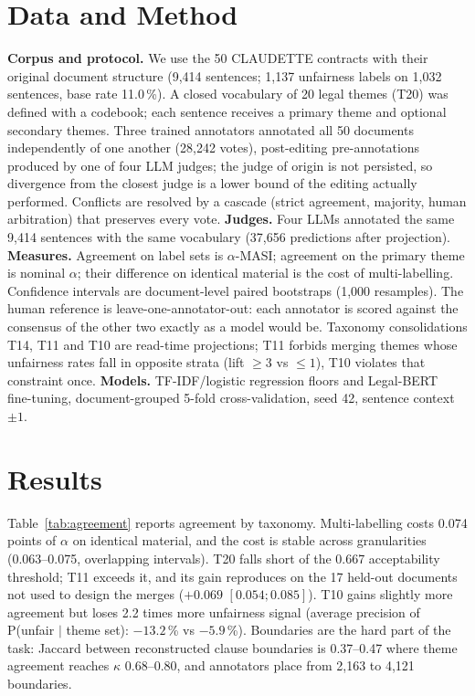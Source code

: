 \documentclass{IOS-Book-Article}
\newcommand{\corpus}{CLAUDETTE}
\begin{document}
\section{Data and Method}
\label{sec:method}
\textbf{Corpus and protocol.} We use the 50 \corpus{} contracts with their original document structure (9,414 sentences; 1,137 unfairness labels on 1,032 sentences, base rate 11.0\,\%). A closed vocabulary of 20 legal themes (T20) was defined with a codebook; each sentence receives a primary theme and optional secondary themes. Three trained annotators annotated all 50 documents independently of one another (28,242 votes), post-editing pre-annotations produced by one of four LLM judges; the judge of origin is not persisted, so divergence from the closest judge is a lower bound of the editing actually performed. Conflicts are resolved by a cascade (strict agreement, majority, human arbitration) that preserves every vote. \textbf{Judges.} Four LLMs annotated the same 9,414 sentences with the same vocabulary (37,656 predictions after projection). \textbf{Measures.} Agreement on label sets is $\alpha$-MASI; agreement on the primary theme is nominal $\alpha$; their difference on identical material is the cost of multi-labelling. Confidence intervals are document-level paired bootstraps (1,000 resamples). The human reference is leave-one-annotator-out: each annotator is scored against the consensus of the other two exactly as a model would be. Taxonomy consolidations T14, T11 and T10 are read-time projections; T11 forbids merging themes whose unfairness rates fall in opposite strata (lift $\ge 3$ vs $\le 1$), T10 violates that constraint once. \textbf{Models.} TF-IDF/logistic regression floors and Legal-BERT~\cite{chalkidis2020legalbert} fine-tuning, document-grouped 5-fold cross-validation, seed 42, sentence context $\pm1$.

\section{Results}
\label{sec:results}
Table~\ref{tab:agreement} reports agreement by taxonomy. Multi-labelling costs 0.074 points of $\alpha$ on identical material, and the cost is stable across granularities (0.063--0.075, overlapping intervals). T20 falls short of the 0.667 acceptability threshold; T11 exceeds it, and its gain reproduces on the 17 held-out documents not used to design the merges ($+0.069$ $[0.054; 0.085]$). T10 gains slightly more agreement but loses 2.2 times more unfairness signal (average precision of P(unfair $\mid$ theme set): $-13.2$\,\% vs $-5.9$\,\%). Boundaries are the hard part of the task: Jaccard between reconstructed clause boundaries is 0.37--0.47 where theme agreement reaches $\kappa$ 0.68--0.80, and annotators place from 2,163 to 4,121 boundaries.
\end{document}
